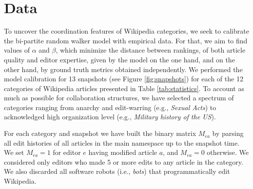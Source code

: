 \section{Data}
To uncover the coordination features of Wikipedia categories, we seek to calibrate the bi-partite random walker model with empirical data. For that, we aim to find values of $\alpha$ and $\beta$, which minimize the distance between rankings, of both article quality and editor expertise, given by the model on the one hand, and on the other hand, by ground truth metrics obtained independently. We performed the model calibration for 13 snapshots (see Figure \ref{fig:snapshots})  for each of  the 12 categories of Wikipedia articles presented in Table \nolinebreak \ref{tab:statistics}. To account as much as possible for collaboration structures, we have selected a spectrum of categories ranging from anarchy and edit-warring (e.g., {\it Sexual Acts}) to acknowledged high organization level (e.g., {\it Military history of the US}).

For each category and snapshot we have built the binary matrix $M_{ea}$ by parsing all edit histories of all articles in the main namespace up to the snapshot time. We set $M_{ea} = 1$ for editor $e$ having modified article $a$, and $M_{ea} = 0$ otherwise. We considered only editors who made 5 or more edits to any article in the category. We also discarded all software robots (i.e., {\it bots}) that programmatically edit Wikipedia. 

